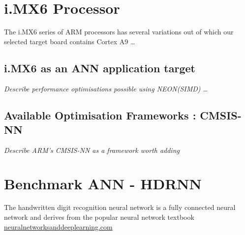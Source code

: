 \section[iMX6 Processor]{i.MX6 Processor}

The i.MX6 series of ARM processors has several variations out of which our selected target board contains Cortex A9 \dots


\subsection[ANN Acceleration]{i.MX6 as an ANN application target}
\textit{Describe performance optimisations possible using NEON(SIMD) \dots}

\subsection[CMSIS-NN]{Available Optimisation Frameworks : CMSIS-NN}
\textit{Describe ARM's CMSIS-NN as a framework worth adding}

\section[Handwritten Digit Recognition (HDR)]{Benchmark ANN - HDRNN}

The handwritten digit recognition neural network is a fully connected neural network and derives from the popular neural network textbook \href{http://neuralnetworksanddeeplearning.com}{neuralnetworksanddeeplearning.com}

